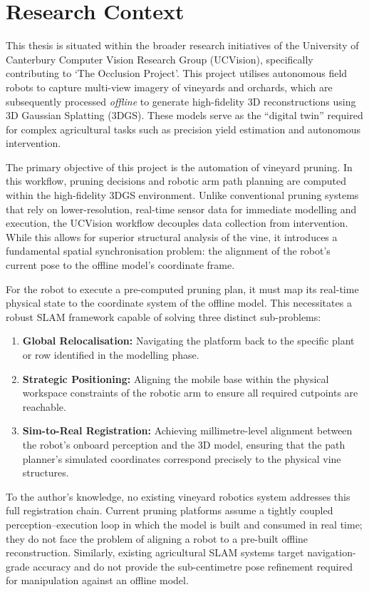 \section{Research Context}
\label{sec:research-context}

This thesis is situated within the broader research initiatives of the University of Canterbury Computer Vision Research Group (UCVision), specifically contributing to `The Occlusion Project'. This project utilises autonomous field robots to capture multi-view imagery of vineyards and orchards, which are subsequently processed \textit{offline} to generate high-fidelity 3D reconstructions using 3D Gaussian Splatting (3DGS). These models serve as the ``digital twin'' required for complex agricultural tasks such as precision yield estimation and autonomous intervention.

The primary objective of this project is the automation of vineyard pruning. In this workflow, pruning decisions and robotic arm path planning are computed within the high-fidelity 3DGS environment. Unlike conventional pruning systems that rely on lower-resolution, real-time sensor data for immediate modelling and execution, the UCVision workflow decouples data collection from intervention. While this allows for superior structural analysis of the vine, it introduces a fundamental spatial synchronisation problem: the alignment of the robot's current pose to the offline model's coordinate frame.

For the robot to execute a pre-computed pruning plan, it must map its real-time physical state to the coordinate system of the offline model. This necessitates a robust SLAM framework capable of solving three distinct sub-problems:
\begin{enumerate}
    \item \textbf{Global Relocalisation:} Navigating the platform back to the specific plant or row identified in the modelling phase.
    \item \textbf{Strategic Positioning:} Aligning the mobile base within the physical workspace constraints of the robotic arm to ensure all required cutpoints are reachable.
    \item \textbf{Sim-to-Real Registration:} Achieving millimetre-level alignment between the robot's onboard perception and the 3D model, ensuring that the path planner's simulated coordinates correspond precisely to the physical vine structures.
\end{enumerate}

To the author's knowledge, no existing vineyard robotics system addresses this full registration chain. Current pruning platforms assume a tightly coupled perception--execution loop in which the model is built and consumed in real time; they do not face the problem of aligning a robot to a pre-built offline reconstruction. Similarly, existing agricultural SLAM systems target navigation-grade accuracy and do not provide the sub-centimetre pose refinement required for manipulation against an offline model.

